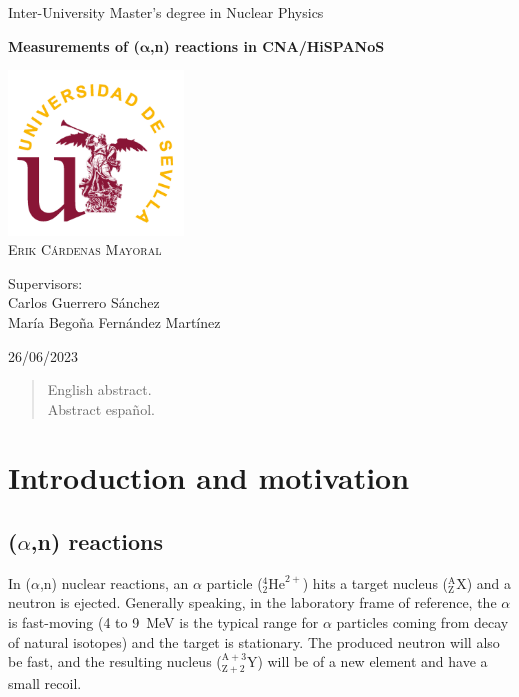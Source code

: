 \documentclass[a4paper,12pt]{report}
\newcommand{\an}{($\alpha$,n) }
\begin{document}
\begin{titlepage}
	\centering
	\Huge Inter-University Master's degree in Nuclear Physics\par
	\vspace*{3cm}
	\HUGE \textbf{Measurements of ($\bm{\alpha}$,n) reactions in CNA/HiSPANoS}\par	%
	\vspace{1cm}
	\includegraphics[width=0.35\textwidth]{us.png}\\
	\vspace{1cm}
	\Large \textsc{Erik Cárdenas Mayoral}\par
	\vspace{2cm}
	Supervisors:\\
	Carlos Guerrero Sánchez\\
	María Begoña Fernández Martínez\par
	\vfill
	26/06/2023
\end{titlepage}

\begin{abstract}
English abstract.
\\
Abstract español.
\end{abstract}

\tableofcontents

\chapter{Introduction and motivation}

\section{\an reactions}
In \an nuclear reactions, an $\alpha$ particle ($^4_2\text{He}^{2+}$) hits a target nucleus ($^\text{A}_\text{Z}\text{X}$) and a neutron is ejected.
Generally speaking, in the laboratory frame of reference, the $\alpha$ is fast-moving (4 to \qty{9}{\MeV} is the typical range for $\alpha$ particles coming from decay of natural isotopes) and the target is stationary.
The produced neutron will also be fast, and the resulting nucleus ($^{\text{A}+3}_{\text{Z}+2}\text{Y}$) will be of a new element and have a small recoil.
\end{document}
